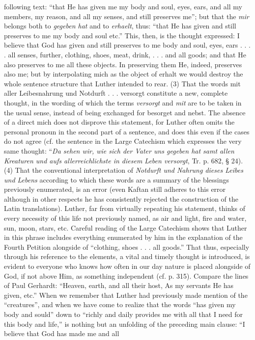 following text: “that He has given me my body and soul, eyes, ears, and all my members, my reason, and all my senses, and still preserves me”; but that the \emph{mir} belongs both to \emph{gegeben hat} and to \emph{erhaelt}, thus: “that He has given and still preserves to me my body and soul etc.” This, then, is the thought expressed: I believe that God has given and still preserves to me body and soul, eyes, ears . . . . all senses, further, clothing, shoes, meat, drink, . . . and all goods; and that He also preserves to me all these objects. In preserving them He, indeed, preserves also me; but by interpolating mich as the object of erhalt we would destroy the whole sentence structure that Luther intended to rear. (3) That the words mit aller Leibesnahrung und Notdurft . . . versorgt constitute a new, complete thought, in the wording of which the terms \emph{versorgt} and \emph{mit} are to be taken in the usual sense, instead of being exchanged for besorget and nebst. The absence of a direct mich does not disprove this statement, for Luther often omits the personal pronoun in the second part of a sentence, and does this even if the cases do not agree (cf. the sentence in the Large Catechism which expresses the very same thought: “\emph{Da sehen wir, wie sich der Vater uns gegeben hat samt allen Kreaturen und aufs allerreichlichste in diesem Leben versorgt}, Tr. p. 682, § 24). (4) That the conventional interpretation of \emph{Notdurft und Nahrung dieses Leibes und Lebens} according to which these words are a summary of the blessings previously enumerated, is an error (even Kaftan still adheres to this error although in other respects he has consistently rejected the construction of the Latin translations). Luther, far from virtually repeating his statement, thinks of every necessity of this life not previously named, as air and light, fire and water, sun, moon, stars, etc. Careful reading of the Large Catechism shows that Luther in this phrase includes everything enumerated by him in the explanation of the Fourth Petition alongside of “clothing, shoes . . . all goods.” That thus, especially through his reference to the elements, a vital and timely thought is introduced, is evident to everyone who knows how often in our day nature is placed alongside of God, if not above Him, as something independent (cf. p. 315). Compare the lines of Paul Gerhardt: “Heaven, earth, and all their host, As my servants He has given, etc.” When we remember that Luther had previously made mention of the “creatures”, and when we have come to realize that the words “has given my body and sould” down to “richly and daily provides me with all that I need for this body and life,” is nothing but an unfolding of the preceding main clause: “I believe that God has made me and all
